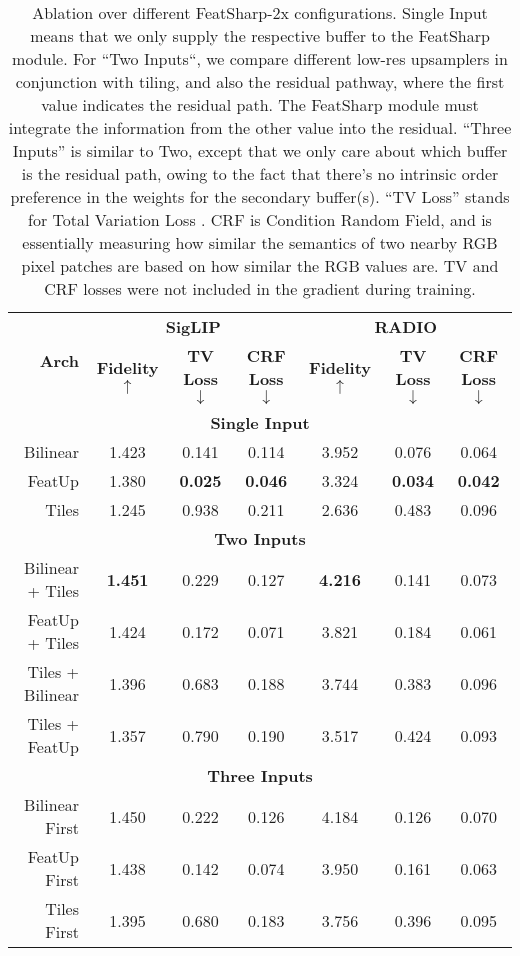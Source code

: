 \begin{table}[h]
    \centering
    \begin{tabular}{r|ccc|ccc}
        \multirow{2}{*}{\bf{Arch}} & \multicolumn{3}{c|}{\bf{SigLIP}} & \multicolumn{3}{c}{\bf{RADIO}} \\
                & \bf{Fidelity $\uparrow$} & \bf{TV Loss $\downarrow$} & \bf{CRF Loss $\downarrow$} & \bf{Fidelity $\uparrow$} & \bf{TV Loss $\downarrow$} & \bf{CRF Loss $\downarrow$} \\
        \hline
        \multicolumn{7}{c}{\bf{Single Input}} \\
        \hline
        Bilinear         & 1.423      & 0.141      & 0.114      & 3.952      & 0.076      & 0.064       \\
        FeatUp           & 1.380      & \bf{0.025} & \bf{0.046} & 3.324      & \bf{0.034} & \bf{0.042}  \\
        Tiles            & 1.245      & 0.938      & 0.211      & 2.636      & 0.483      & 0.096       \\
        \hline
        \multicolumn{7}{c}{\bf{Two Inputs}} \\
        \hline
        Bilinear + Tiles & \bf{1.451} & 0.229      & 0.127      & \bf{4.216} & 0.141      & 0.073       \\
        FeatUp + Tiles   & 1.424      & 0.172      & 0.071      & 3.821      & 0.184      & 0.061       \\
        Tiles + Bilinear & 1.396      & 0.683      & 0.188      & 3.744      & 0.383      & 0.096       \\
        Tiles + FeatUp   & 1.357      & 0.790      & 0.190      & 3.517      & 0.424      & 0.093       \\
        \hline
        \multicolumn{7}{c}{\bf{Three Inputs}} \\
        \hline
        Bilinear First   & 1.450      & 0.222      & 0.126      & 4.184      & 0.126      & 0.070       \\
        FeatUp First     & 1.438      & 0.142      & 0.074      & 3.950      & 0.161      & 0.063       \\
        Tiles First      & 1.395      & 0.680      & 0.183      & 3.756      & 0.396      & 0.095       \\
    \end{tabular}
    \caption{Ablation over different FeatSharp-2x configurations. Single Input means that we only supply the respective buffer to the FeatSharp  module. For ``Two Inputs``, we compare different low-res upsamplers in conjunction with tiling, and also the residual pathway, where the first value indicates the residual path. The FeatSharp module must integrate the information from the other value into the residual. ``Three Inputs'' is similar to Two, except that we only care about which buffer is the residual path, owing to the fact that there's no intrinsic order preference in the weights for the secondary buffer(s). ``TV Loss'' stands for Total Variation Loss \cite{rudin1992tvloss}. CRF is Condition Random Field, and is essentially measuring how similar the semantics of two nearby RGB pixel patches are based on how similar the RGB values are. TV and CRF losses were not included in the gradient during training.}

\end{table}
